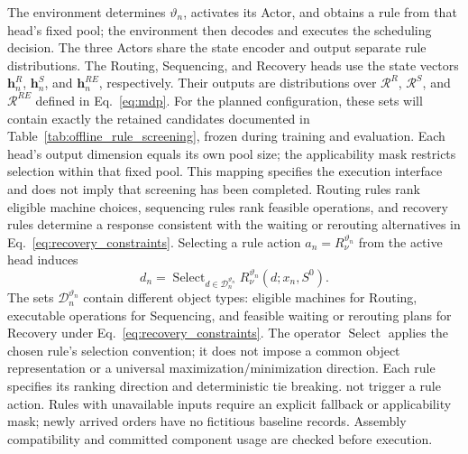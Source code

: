 The environment determines $\vartheta_n$, activates its Actor, and obtains a rule from that
head's fixed pool; the environment then decodes and executes the scheduling decision.
The three Actors share the state encoder and output separate rule distributions.
The Routing, Sequencing, and Recovery heads use the state vectors
$\boldsymbol h_n^R$, $\boldsymbol h_n^S$, and $\boldsymbol h_n^{RE}$, respectively.
Their outputs are distributions over $\mathcal R^R$, $\mathcal R^S$, and $\mathcal R^{RE}$
defined in Eq.~\eqref{eq:mdp}. For the planned configuration, these sets will contain exactly the
retained candidates documented in Table~\ref{tab:offline_rule_screening}, frozen during training
and evaluation. Each head's output dimension equals its own pool size; the applicability mask
restricts selection within that fixed pool. This mapping specifies the execution interface and
does not imply that screening has been completed. Routing rules rank eligible machine choices, sequencing rules
rank feasible operations, and recovery rules determine a response consistent with the waiting
or rerouting alternatives in Eq.~\eqref{eq:recovery_constraints}.
Selecting a rule action $a_n=R_\nu^{\vartheta_n}$ from the active head induces
\begin{equation}
 d_n=\operatorname{Select}_{d\in\mathcal D_n^{\vartheta_n}}
 R_\nu^{\vartheta_n}(d;x_n,S^0).
 \label{eq:rule_decoding}
\end{equation}
The sets $\mathcal D_n^{\vartheta_n}$ contain different object types: eligible machines for
Routing, executable operations for Sequencing, and feasible waiting or rerouting plans for Recovery
under Eq.~\eqref{eq:recovery_constraints}. The operator $\operatorname{Select}$ applies the chosen
rule's selection convention; it does not impose a common object representation or a universal
maximization/minimization direction. Each rule specifies its ranking direction and deterministic tie breaking.
not trigger a rule action. Rules with unavailable inputs require an explicit fallback or applicability mask;
newly arrived orders have no fictitious baseline records. Assembly compatibility and committed component
usage are checked before execution.

